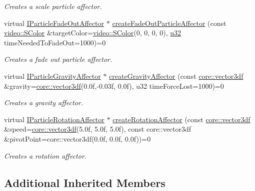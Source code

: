 \begin{DoxyCompactItemize}
\begin{DoxyCompactList}\small\item\em Creates a scale particle affector. \end{DoxyCompactList}\item 
virtual \hyperlink{classirr_1_1scene_1_1IParticleFadeOutAffector}{I\+Particle\+Fade\+Out\+Affector} $\ast$ \hyperlink{classirr_1_1scene_1_1IParticleSystemSceneNode_a4a9c3ecdf6118267f312f9389bb24888}{create\+Fade\+Out\+Particle\+Affector} (const \hyperlink{classirr_1_1video_1_1SColor}{video\+::\+S\+Color} \&target\+Color=\hyperlink{classirr_1_1video_1_1SColor}{video\+::\+S\+Color}(0, 0, 0, 0), \hyperlink{namespaceirr_a0416a53257075833e7002efd0a18e804}{u32} time\+Needed\+To\+Fade\+Out=1000)=0
\begin{DoxyCompactList}\small\item\em Creates a fade out particle affector. \end{DoxyCompactList}\item 
virtual \hyperlink{classirr_1_1scene_1_1IParticleGravityAffector}{I\+Particle\+Gravity\+Affector} $\ast$ \hyperlink{classirr_1_1scene_1_1IParticleSystemSceneNode_af06d3565f9c352bdcdf68bb2e3797c32}{create\+Gravity\+Affector} (const \hyperlink{namespaceirr_1_1core_ae6e2b2a6c552833ebbd5b7463d03586b}{core\+::vector3df} \&gravity=\hyperlink{namespaceirr_1_1core_ae6e2b2a6c552833ebbd5b7463d03586b}{core\+::vector3df}(0.\+0f,-\/0.\+03f, 0.\+0f), u32 time\+Force\+Lost=1000)=0
\begin{DoxyCompactList}\small\item\em Creates a gravity affector. \end{DoxyCompactList}\item 
virtual \hyperlink{classirr_1_1scene_1_1IParticleRotationAffector}{I\+Particle\+Rotation\+Affector} $\ast$ \hyperlink{classirr_1_1scene_1_1IParticleSystemSceneNode_a7a09b7ebc0d4a2d164233c42689623d6}{create\+Rotation\+Affector} (const \hyperlink{namespaceirr_1_1core_ae6e2b2a6c552833ebbd5b7463d03586b}{core\+::vector3df} \&speed=\hyperlink{namespaceirr_1_1core_ae6e2b2a6c552833ebbd5b7463d03586b}{core\+::vector3df}(5.\+0f, 5.\+0f, 5.\+0f), const core\+::vector3df \&pivot\+Point=core\+::vector3df(0.\+0f, 0.\+0f, 0.\+0f))=0
\begin{DoxyCompactList}\small\item\em Creates a rotation affector. \end{DoxyCompactList}\end{DoxyCompactItemize}
\subsection*{Additional Inherited Members}


